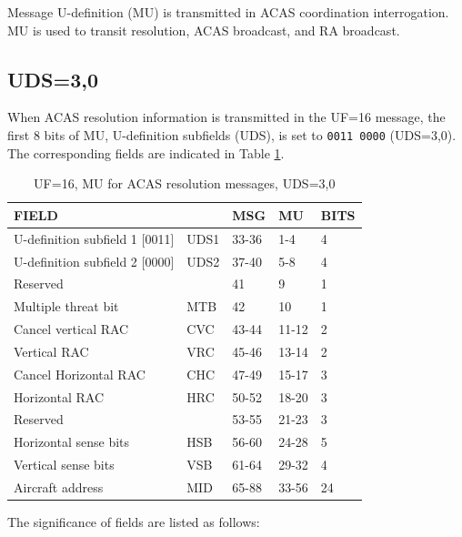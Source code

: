 Message U-definition (MU) is transmitted in ACAS coordination interrogation. MU is used to transit resolution, ACAS broadcast, and RA broadcast.


\subsection{UDS=3,0}

When ACAS resolution information is transmitted in the UF=16 message, the first 8 bits of MU, U-definition subfields (UDS), is set to \texttt{0011 0000} (UDS=3,0). The corresponding fields are indicated in Table \ref{tb:acas_mu_uds30}.

\begin{table}[ht]
\caption{UF=16, MU for ACAS resolution messages, UDS=3,0}
\label{tb:acas_mu_uds30}
\begin{tabular}{|l|l|l|l|l|}
\hline
\textbf{FIELD} & \textbf{} & \textbf{MSG} & \textbf{MU} & \textbf{BITS} \\ \hline
U-definition subfield 1 [0011] & UDS1 & 33-36 & 1-4 & 4 \\ \hline
U-definition subfield 2 [0000] & UDS2 & 37-40 & 5-8 & 4 \\ \hline
Reserved &  & 41 & 9 & 1 \\ \hline
Multiple threat bit & MTB & 42 & 10 & 1 \\ \hline
Cancel vertical RAC & CVC & 43-44 & 11-12 & 2 \\ \hline
Vertical RAC & VRC & 45-46 & 13-14 & 2 \\ \hline
Cancel Horizontal RAC & CHC & 47-49 & 15-17 & 3 \\ \hline
Horizontal RAC & HRC & 50-52 & 18-20 & 3 \\ \hline
Reserved &  & 53-55 & 21-23 & 3 \\ \hline
Horizontal sense bits & HSB & 56-60 & 24-28 & 5 \\ \hline
Vertical sense bits & VSB & 61-64 & 29-32 & 4 \\ \hline
Aircraft address & MID & 65-88 & 33-56 & 24 \\ \hline
\end{tabular}
\end{table}

The significance of fields are listed as follows:


